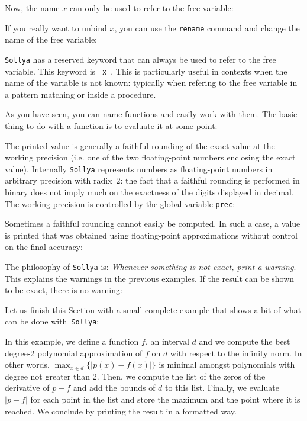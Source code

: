 \documentclass[a4paper]{article}
\newcommand{\com}[1]{\texttt{#1}}
\newcommand{\sollya}{\texttt{Sollya}\xspace}
\begin{document}


Now, the name $x$ can only be used to refer to the free variable:



If you really want to unbind $x$, you can use the \com{rename} command and change the name of the free variable:



\sollya has a reserved keyword that can always be used to refer to the free variable. This keyword is \verb|_x_|. This is particularly useful in contexts when the name of the variable is not known: typically when refering to the free variable in a pattern matching or inside a procedure.



As you have seen, you can name functions and easily work with them. The basic thing to do with a function is to evaluate it at some point:



The printed value is generally a faithful rounding of the exact value at the working precision (i.e. one of the two floating-point numbers enclosing the exact value). Internally \sollya represents numbers as floating-point numbers in arbitrary precision with radix~$2$: the fact that a faithful rounding is performed in binary does not imply much on the exactness of the digits displayed in decimal. The working precision is controlled by the global variable \com{prec}:



Sometimes a faithful rounding cannot easily be computed. In such a case, a value is printed that was obtained using floating-point approximations without control on the final accuracy:



The philosophy of \sollya is: \emph{Whenever something is not exact, print a warning}. This explains the warnings in the previous examples. If the result can be shown to be exact, there is no warning:



Let us finish this Section with a small complete example that shows a bit of what can be done with~\sollya:



In this example, we define a function $f$, an interval $d$ and we compute the best degree-2 polynomial approximation of $f$ on $d$ with respect to the infinity norm. In other words, $\max_{x \in d} \{|p(x)-f(x)|\}$ is minimal amongst polynomials with degree not greater than $2$. Then, we compute the list of the zeros of the derivative of $p-f$ and add the bounds of $d$ to this list. Finally, we evaluate $|p-f|$ for each point in the list and store the maximum and the point where it is reached. We conclude by printing the result in a formatted way.
\end{document}
